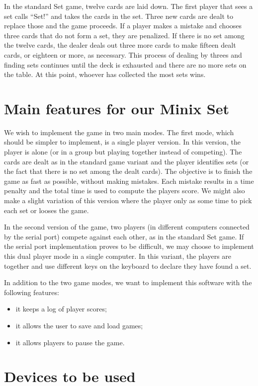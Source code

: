 \documentclass[11pt,a4paper,reqno]{report}
\numberwithin{equation}{section}
\begin{document}
In the standard Set game, twelve cards are laid down. The first player that sees a set calls ``Set!'' and takes the cards in the set. Three new cards are dealt to replace those and the game proceeds. If a player makes a mistake and chooses three cards that do not form a set, they are penalized. If there is no set among the twelve cards, the dealer deals out three more cards to make fifteen dealt cards, or eighteen or more, as necessary. This process of dealing by threes and finding sets continues until the deck is exhausted and there are no more sets on the table. At this point, whoever has collected the most sets wins.


\chapter{Main features for our Minix Set}

We wish to implement the game in two main modes. The first mode, which should be simpler to implement, is a single player version. In this version, the player is alone (or in a group but playing together instead of competing). The cards are dealt as in the standard game variant and the player identifies sets (or the fact that there is no set among the dealt cards). The objective is to finish the game as fast as possible, without making mistakes. Each mistake results in a time penalty and the total time is used to compute the players score. We might also make a slight variation of this version where the player only as some time to pick each set or looses the game.

In the second version of the game, two players (in different computers connected by the serial port) compete against each other, as in the standard Set game. If the serial port implementation proves to be difficult, we may choose to implement this dual player mode in a single computer. In this variant, the players are together and use different keys on the keyboard to declare they have found a set.

In addition to the two game modes, we want to implement this software with the following features:
\begin{itemize}
\item it keeps a log of player scores;
\item it allows the user to save and load games;
\item it allows players to pause the game.
\end{itemize}

\chapter{Devices to be used}
\end{document}
